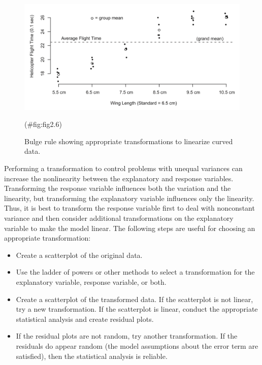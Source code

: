 \documentclass[
]{report}
\providecommand{\tightlist}{%
  \setlength{\itemsep}{0pt}\setlength{\parskip}{0pt}}
\begin{document}
\begin{figure}

{\centering \includegraphics[width=1\linewidth]{docs/Fig2_6} 

}

\caption{Bulge rule showing appropriate transformations to linearize curved data.}(\#fig:fig2.6)
\end{figure}

Performing a transformation to control problems with unequal variances can increase the nonlinearity between the explanatory and response variables. Transforming the response variable influences both the variation and the linearity, but transforming the explanatory variable influences only the linearity. Thus, it is best to transform the response variable first to deal with nonconstant variance and then consider additional transformations on the explanatory variable to make the model linear. The following steps are useful for choosing an appropriate transformation:

\begin{itemize}
\tightlist
\item
  Create a scatterplot of the original data.
\item
  Use the ladder of powers or other methods to select a transformation for the explanatory variable, response variable, or both.
\item
  Create a scatterplot of the transformed data. If the scatterplot is not linear, try a new transformation. If the scatterplot is linear, conduct the appropriate statistical analysis and create residual plots.
\item
  If the residual plots are not random, try another transformation. If the residuals do appear random (the model assumptions about the error term are satisfied), then the statistical analysis is reliable.
\end{itemize}
\end{document}

